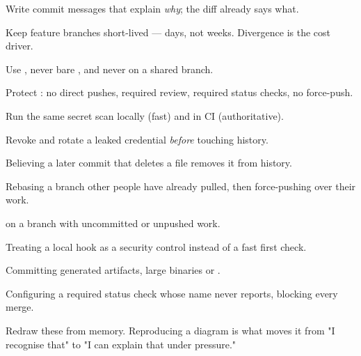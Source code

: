 \begin{bestpractices}
\begin{wbitem}
  \item Write commit messages that explain \emph{why}; the diff already says what.
  \item Keep feature branches short-lived --- days, not weeks. Divergence is the cost driver.
  \item Use , never bare , and never on a shared branch.
  \item Protect : no direct pushes, required review, required status checks, no force-push.
  \item Run the same secret scan locally (fast) and in CI (authoritative).
  \item Revoke and rotate a leaked credential \emph{before} touching history.
\end{wbitem}
\end{bestpractices}
\begin{mistakes}
\begin{wbitem}
  \item Believing a later commit that deletes a file removes it from history.
  \item Rebasing a branch other people have already pulled, then force-pushing over their work.
  \item {} on a branch with uncommitted or unpushed work.
  \item Treating a local hook as a security control instead of a fast first check.
  \item Committing generated artifacts, large binaries or .
  \item Configuring a required status check whose name never reports, blocking every merge.
\end{wbitem}
\end{mistakes}


Redraw these from memory. Reproducing a diagram is what moves it from "I recognise that" to "I can explain that under pressure."

\begin{writespace}
\end{writespace}


